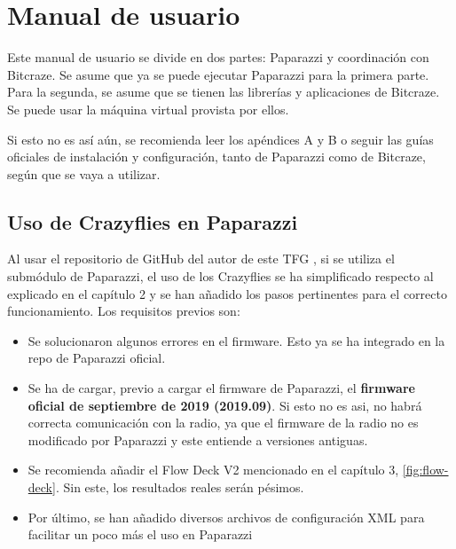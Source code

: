 


\chapter{Manual de usuario}\label{appendix:user_manual}

Este manual de usuario se divide en dos partes: Paparazzi y coordinación con Bitcraze. 
Se asume que ya se puede ejecutar Paparazzi para la primera parte. 
Para la segunda, se asume que se tienen las librerías y aplicaciones de Bitcraze. 
Se puede usar la máquina virtual provista por ellos.

Si esto no es así aún, se recomienda leer los apéndices A y B o seguir las guías oficiales de instalación y configuración, 
tanto de Paparazzi como de Bitcraze, según que se vaya a utilizar.  

\section{Uso de Crazyflies en Paparazzi}

Al usar el repositorio de GitHub del autor de este TFG \cite{bt-crazyflies}, 
si se utiliza el submódulo de Paparazzi, el uso de los Crazyflies se ha simplificado
respecto al explicado en el capítulo 2 y se han añadido los pasos pertinentes para el correcto funcionamiento. Los requisitos previos son:

\begin{itemize}
    \item Se solucionaron algunos errores en el firmware. Esto ya se ha integrado en la repo de Paparazzi oficial.
    \item Se ha de cargar, previo a cargar el firmware de Paparazzi, el \textbf{firmware oficial de septiembre de 2019 (2019.09)}. 
    Si esto no es asi, no habrá correcta comunicación con la radio, ya que el firmware de la radio no es modificado por Paparazzi y este entiende a versiones antiguas.
    \item Se recomienda añadir el Flow Deck V2 mencionado en el capítulo 3, \autoref{fig:flow-deck}. Sin este, los resultados reales serán pésimos.
    \item Por último, se han añadido diversos archivos de configuración XML para facilitar un poco más el uso en Paparazzi
\end{itemize}

